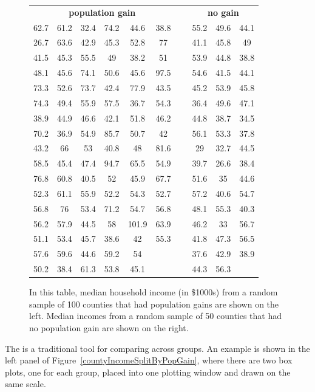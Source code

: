 \begin{figure}
\centering
\begin{tabular}{ ccc ccc c ccc }
\multicolumn{6}{c}{\bf population gain} &&
    \multicolumn{3}{c}{\bf no gain} \\ 
  \cline{1-6} \cline{8-10}
62.7 & 61.2 & 32.4 & 74.2 & 44.6 & 38.8 &\hspace{5mm}\ &
    55.2 & 49.6 & 44.1 \\
26.7 & 63.6 & 42.9 & 45.3 & 52.8 & 77 && 41.1 & 45.8 & 49 \\
41.5 & 45.3 & 55.5 & 49 & 38.2 & 51 && 53.9 & 44.8 & 38.8 \\
48.1 & 45.6 & 74.1 & 50.6 & 45.6 & 97.5 && 54.6 & 41.5 & 44.1 \\
73.3 & 52.6 & 73.7 & 42.4 & 77.9 & 43.5 && 45.2 & 53.9 & 45.8 \\
74.3 & 49.4 & 55.9 & 57.5 & 36.7 & 54.3 && 36.4 & 49.6 & 47.1 \\
38.9 & 44.9 & 46.6 & 42.1 & 51.8 & 46.2 && 44.8 & 38.7 & 34.5 \\
70.2 & 36.9 & 54.9 & 85.7 & 50.7 & 42 && 56.1 & 53.3 & 37.8 \\
43.2 & 66 & 53 & 40.8 & 48 & 81.6 && 29 & 32.7 & 44.5 \\
58.5 & 45.4 & 47.4 & 94.7 & 65.5 & 54.9 && 39.7 & 26.6 & 38.4 \\
76.8 & 60.8 & 40.5 & 52 & 45.9 & 67.7 && 51.6 & 35 & 44.6 \\
52.3 & 61.1 & 55.9 & 52.2 & 54.3 & 52.7 && 57.2 & 40.6 & 54.7 \\
56.8 & 76 & 53.4 & 71.2 & 54.7 & 56.8 && 48.1 & 55.3 & 40.3 \\
56.2 & 57.9 & 44.5 & 58 & 101.9 & 63.9 && 46.2 & 33 & 56.7 \\
51.1 & 53.4 & 45.7 & 38.6 & 42 & 55.3 && 41.8 & 47.3 & 56.5 \\
57.6 & 59.6 & 44.6 & 59.2 & 54 &  && 37.6 & 42.9 & 38.9 \\
50.2 & 38.4 & 61.3 & 53.8 & 45.1 &  && 44.3 & 56.3 &  \\
\cline{1-6} \cline{8-10}
\end{tabular}
\caption{In this table, median household income (in \$1000s)
    from a random sample of 100 counties that had population
    gains are shown on the left.
    Median incomes from a random sample of 50 counties that
    had no population gain are shown on the right.}
\label{countyIncomeSplitByPopGainTable}
\end{figure}

The 
is a traditional tool for comparing across groups.
An example is shown in the left panel of
Figure~\ref{countyIncomeSplitByPopGain},
where there are two box plots, one for each group,
placed into one plotting window and drawn on the same scale.


